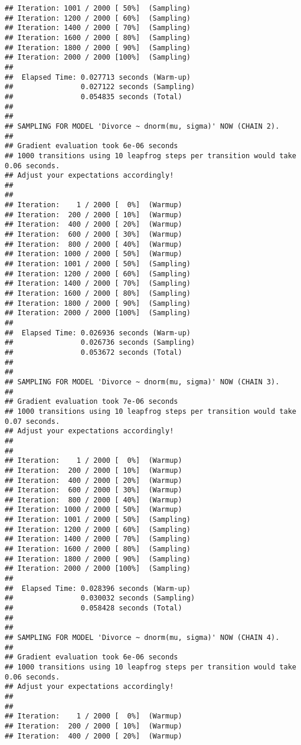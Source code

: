 \documentclass[]{article}
\begin{document}
\begin{verbatim}
## Iteration: 1001 / 2000 [ 50%]  (Sampling)
## Iteration: 1200 / 2000 [ 60%]  (Sampling)
## Iteration: 1400 / 2000 [ 70%]  (Sampling)
## Iteration: 1600 / 2000 [ 80%]  (Sampling)
## Iteration: 1800 / 2000 [ 90%]  (Sampling)
## Iteration: 2000 / 2000 [100%]  (Sampling)
## 
##  Elapsed Time: 0.027713 seconds (Warm-up)
##                0.027122 seconds (Sampling)
##                0.054835 seconds (Total)
## 
## 
## SAMPLING FOR MODEL 'Divorce ~ dnorm(mu, sigma)' NOW (CHAIN 2).
## 
## Gradient evaluation took 6e-06 seconds
## 1000 transitions using 10 leapfrog steps per transition would take 0.06 seconds.
## Adjust your expectations accordingly!
## 
## 
## Iteration:    1 / 2000 [  0%]  (Warmup)
## Iteration:  200 / 2000 [ 10%]  (Warmup)
## Iteration:  400 / 2000 [ 20%]  (Warmup)
## Iteration:  600 / 2000 [ 30%]  (Warmup)
## Iteration:  800 / 2000 [ 40%]  (Warmup)
## Iteration: 1000 / 2000 [ 50%]  (Warmup)
## Iteration: 1001 / 2000 [ 50%]  (Sampling)
## Iteration: 1200 / 2000 [ 60%]  (Sampling)
## Iteration: 1400 / 2000 [ 70%]  (Sampling)
## Iteration: 1600 / 2000 [ 80%]  (Sampling)
## Iteration: 1800 / 2000 [ 90%]  (Sampling)
## Iteration: 2000 / 2000 [100%]  (Sampling)
## 
##  Elapsed Time: 0.026936 seconds (Warm-up)
##                0.026736 seconds (Sampling)
##                0.053672 seconds (Total)
## 
## 
## SAMPLING FOR MODEL 'Divorce ~ dnorm(mu, sigma)' NOW (CHAIN 3).
## 
## Gradient evaluation took 7e-06 seconds
## 1000 transitions using 10 leapfrog steps per transition would take 0.07 seconds.
## Adjust your expectations accordingly!
## 
## 
## Iteration:    1 / 2000 [  0%]  (Warmup)
## Iteration:  200 / 2000 [ 10%]  (Warmup)
## Iteration:  400 / 2000 [ 20%]  (Warmup)
## Iteration:  600 / 2000 [ 30%]  (Warmup)
## Iteration:  800 / 2000 [ 40%]  (Warmup)
## Iteration: 1000 / 2000 [ 50%]  (Warmup)
## Iteration: 1001 / 2000 [ 50%]  (Sampling)
## Iteration: 1200 / 2000 [ 60%]  (Sampling)
## Iteration: 1400 / 2000 [ 70%]  (Sampling)
## Iteration: 1600 / 2000 [ 80%]  (Sampling)
## Iteration: 1800 / 2000 [ 90%]  (Sampling)
## Iteration: 2000 / 2000 [100%]  (Sampling)
## 
##  Elapsed Time: 0.028396 seconds (Warm-up)
##                0.030032 seconds (Sampling)
##                0.058428 seconds (Total)
## 
## 
## SAMPLING FOR MODEL 'Divorce ~ dnorm(mu, sigma)' NOW (CHAIN 4).
## 
## Gradient evaluation took 6e-06 seconds
## 1000 transitions using 10 leapfrog steps per transition would take 0.06 seconds.
## Adjust your expectations accordingly!
## 
## 
## Iteration:    1 / 2000 [  0%]  (Warmup)
## Iteration:  200 / 2000 [ 10%]  (Warmup)
## Iteration:  400 / 2000 [ 20%]  (Warmup)

\end{verbatim}
\end{document}
